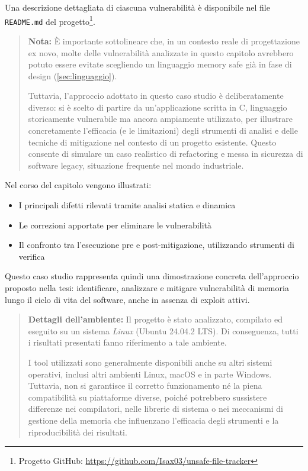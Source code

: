 Una descrizione dettagliata di ciascuna vulnerabilità è disponibile nel file
\texttt{README.md} del progetto\footnote{Progetto GitHub: \url{https://github.com/Isax03/unsafe-file-tracker}}.

\begin{quote}
  \textbf{Nota:} È importante sottolineare che, in un contesto reale di progettazione
  ex novo, molte delle vulnerabilità analizzate in questo capitolo avrebbero
  potuto essere evitate scegliendo un linguaggio memory safe già in fase di
  design (\autoref{sec:linguaggio}).

  Tuttavia, l'approccio adottato in questo caso studio è deliberatamente diverso:
  si è scelto di partire da un'applicazione scritta in C, linguaggio storicamente
  vulnerabile ma ancora ampiamente utilizzato, per illustrare concretamente l'efficacia
  (e le limitazioni) degli strumenti di analisi e delle tecniche di mitigazione
  nel contesto di un progetto esistente. Questo consente di simulare un caso realistico
  di refactoring e messa in sicurezza di software legacy, situazione frequente
  nel mondo industriale.
\end{quote}

Nel corso del capitolo vengono illustrati:
\begin{itemize}
  \item I principali difetti rilevati tramite analisi statica e dinamica

  \item Le correzioni apportate per eliminare le vulnerabilità

  \item Il confronto tra l'esecuzione pre e post-mitigazione, utilizzando
    strumenti di verifica
\end{itemize}

Questo caso studio rappresenta quindi una dimostrazione concreta dell'approccio proposto
nella tesi: identificare, analizzare e mitigare vulnerabilità di memoria lungo il
ciclo di vita del software, anche in assenza di exploit attivi.

\begin{quote}
  \textbf{Dettagli dell'ambiente:} Il progetto è stato analizzato, compilato ed eseguito
  su un sistema \textit{Linux} (Ubuntu 24.04.2 LTS). Di conseguenza, tutti i risultati
  presentati fanno riferimento a tale ambiente.

  I tool utilizzati sono generalmente disponibili anche su altri sistemi operativi,
  inclusi altri ambienti Linux, macOS e in parte Windows. Tuttavia, non si garantisce
  il corretto funzionamento né la piena compatibilità su piattaforme diverse,
  poiché potrebbero sussistere differenze nei compilatori, nelle librerie di sistema
  o nei meccanismi di gestione della memoria che influenzano l'efficacia degli strumenti
  e la riproducibilità dei risultati.
\end{quote}



